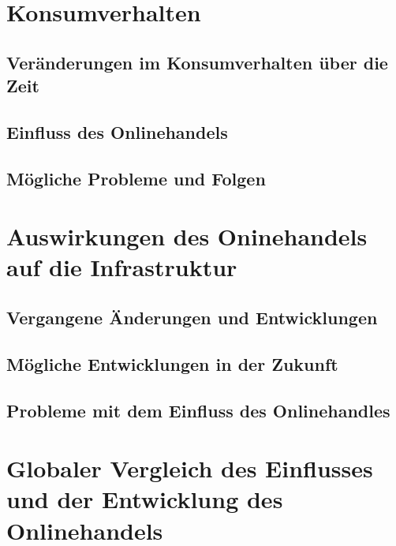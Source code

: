 \documentclass[a4paper, 10pt]{scrartcl}
\begin{document}
    \section{Konsumverhalten}
        \subsection{Veränderungen im Konsumverhalten über die Zeit}
            
            
        \subsection{Einfluss des Onlinehandels}
            
            
        \subsection{Mögliche Probleme und Folgen}
            
            
        
    \section{Auswirkungen des Oninehandels auf die Infrastruktur}
        \subsection{Vergangene Änderungen und Entwicklungen}
            
            
        \subsection{Mögliche Entwicklungen in der Zukunft}
            
            
        \subsection{Probleme mit dem Einfluss des Onlinehandles}
            
            
        
    \section{Globaler Vergleich des Einflusses und der Entwicklung des Onlinehandels}
            
            
\end{document}

